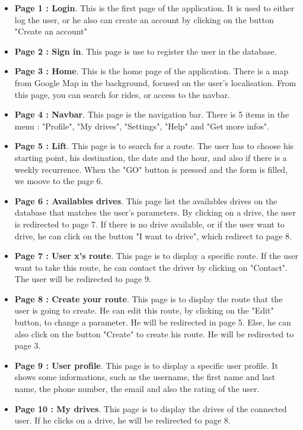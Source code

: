 \begin{itemize}
	\item {\bf Page 1 : Login}. This is the first page of the application. It is used to either log the user, or he also can create an account by clicking on the button "Create an account"
	\item {\bf Page 2 : Sign in}. This page is use to register the user in the database. 
	\item {\bf Page 3 : Home}. This is the home page of the application. There is a map from Google Map in the background, focused on the user's localisation. From this page, you can search for rides, or access to the navbar.
	\item {\bf Page 4 : Navbar}. This page is the navigation bar. There is 5 items in the menu : "Profile", "My drives", "Settings", "Help" and "Get more infos".
	\item {\bf Page 5 : Lift}. This page is to search for a route. The user has to choose his starting point, his destination, the date and the hour, and also if there is a weekly recurrence. When the "GO" button is pressed and the form is filled, we moove to the page 6.
	\item {\bf Page 6 : Availables drives}. This page list the availables drives on the database that matches the user's parameters. By clicking on a drive, the user is redirected to page 7. If there is no drive available, or if the user want to drive, he can click on the button "I want to drive", which redirect to page 8.
	\item {\bf Page 7 : User x's route}. This page is to display a specific route. If the user want to take this route, he can contact the driver by clicking on "Contact". The user will be redirected to page 9.
	\item {\bf Page 8 : Create your route}. This page is to display the route that the user is going to create. He can edit this route, by clicking on the "Edit" button, to change a parameter. He will be redirected in page 5. Else, he can also click on the button "Create" to create his route.  He will be redirected to page 3.
	\item {\bf Page 9 : User profile}. This page is to display a specific user profile. It shows some informations, such as the username, the first name and last name, the phone number, the email and also the rating of the user.
	 \item {\bf Page 10 : My drives}. This page is to display the drives of the connected user. If he clicks on a drive, he will be redirected to page 8.
\end{itemize}
